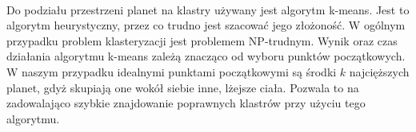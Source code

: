 \paragraph{}
Do podziału przestrzeni planet na klastry używany jest algorytm k-means\cite{kmeans}. Jest to algorytm heurystyczny, przez co trudno jest szacować jego złożoność. W ogólnym przypadku problem klasteryzacji jest problemem NP-trudnym. Wynik oraz czas działania algorytmu k-means zależą znacząco od wyboru punktów początkowych. W naszym przypadku idealnymi punktami początkowymi są środki $k$ najcięższych planet, gdyż skupiają one wokół siebie inne, lżejsze ciała. Pozwala to na zadowalająco szybkie znajdowanie poprawnych klastrów przy użyciu tego algorytmu.
